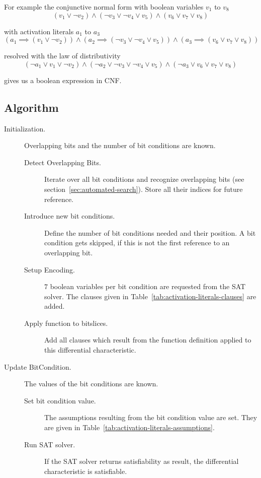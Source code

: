 For example the conjunctive normal form with boolean variables $v_1$ to $v_8$
%
\[
  (v_1 \lor \neg v_2) \land (\neg v_3 \lor \neg v_4 \lor v_5) \land
    (v_6 \lor v_7 \lor v_8)
\]

with activation literals $a_1$ to $a_3$
\[
  (a_1 \implies (v_1 \lor \neg v_2)) \land
    (a_2 \implies (\neg v_3 \lor \neg v_4 \lor v_5)) \land
    (a_3 \implies (v_6 \lor v_7 \lor v_8))
\]

resolved with the law of distributivity
\[
  (\neg a_1 \lor v_1 \lor \neg v_2) \land
    (\neg a_2 \lor \neg v_3 \lor \neg v_4 \lor v_5) \land
    (\neg a_3 \lor v_6 \lor v_7 \lor v_8)
\]

gives us a boolean expression in CNF.

\newpage
\subsection{Algorithm}
\label{sec:activation-literals-algorithm}
%
\begin{description}
  \item[Initialization.] Overlapping bits and the number of bit conditions are known.
    \begin{description}
      \item[Detect Overlapping Bits.] Iterate over all bit conditions and recognize overlapping bits (see section~\ref{sec:automated-search}). Store all their indices for future reference.
      \item[Introduce new bit conditions.] Define the number of bit conditions needed and their position. A bit condition gets skipped, if this is not the first reference to an overlapping bit.
      \item[Setup Encoding.] $7$ boolean variables per bit condition are requested from the SAT solver. The clauses given in Table~\ref{tab:activation-literals-clauses} are added.
      \item[Apply function to bitslices.] Add all clauses which result from the function definition applied to this differential characteristic.
    \end{description}
  \item[Update BitCondition.] The values of the bit conditions are known.
    \begin{description}
      \item[Set bit condition value.] The assumptions resulting from the bit condition value are set. They are given in Table~\ref{tab:activation-literals-assumptions}.
      \item[Run SAT solver.] If the SAT solver returns satisfiability as result, the differential characteristic is satisfiable.
    \end{description}
\end{description}

